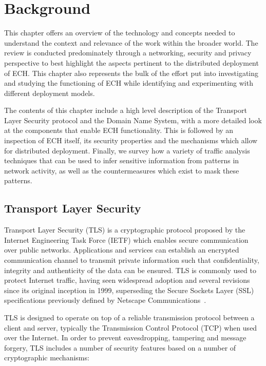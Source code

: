 \chapter{Background}\label{Background}

This chapter offers an overview of the technology and concepts needed to understand the context and relevance of the work within the broader world. The review is conducted predominately through a networking, security and privacy perspective to best highlight the aspects pertinent to the distributed deployment of ECH. This chapter also represents the bulk of the effort put into investigating and studying the functioning of ECH while identifying and experimenting with different deployment models.

The contents of this chapter include a high level description of the Transport Layer Security protocol and the Domain Name System, with a more detailed look at the components that enable ECH functionality. This is followed by an inspection of ECH itself, its security properties and the mechanisms which allow for distributed deployment. Finally, we survey how a variety of traffic analysis techniques that can be used to infer sensitive information from patterns in network activity, as well as the countermeasures which exist to mask these patterns.








\section{Transport Layer Security}

Transport Layer Security (TLS) is a cryptographic protocol proposed by the Internet Engineering Task Force (IETF) which enables secure communication over public networks. Applications and services can establish an encrypted communication channel to transmit private information such that confidentiality, integrity and authenticity of the data can be ensured. TLS is commonly used to protect Internet traffic, having seen widespread adoption and several revisions since its original inception in 1999, superseding the Secure Sockets Layer (SSL) specifications previously defined by Netscape Communications~\cite{chan2018monitoring, LE-HTTPS, rfc2246}.

TLS is designed to operate on top of a reliable transmission protocol between a client and server, typically the Transmission Control Protocol (TCP) when used over the Internet. In order to prevent eavesdropping, tampering and message forgery, TLS includes a number of security features based on a number of cryptographic mechanisms:


